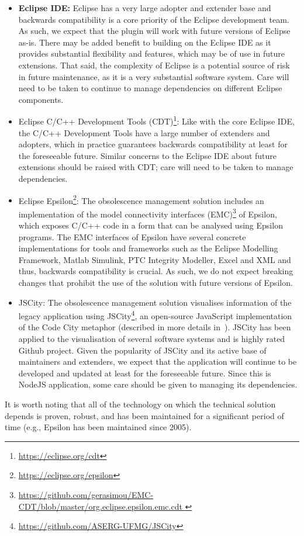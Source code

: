 \documentclass{llncs}
\begin{document}
\begin{itemize}
\item \textbf{Eclipse IDE:} Eclipse has a very large adopter and extender base and backwards compatibility is a core priority of the Eclipse development team. As such, we expect that the plugin will work with future versions of Eclipse as-is. There may be added benefit to building on the Eclipse IDE as it provides substantial flexibility and features, which may be of use in future extensions. That said, the complexity of Eclipse is a potential source of risk in future maintenance, as it is a very substantial software system. Care will need to be taken to continue to manage dependencies on different Eclipse components.

\item Eclipse C/C++ Development Tools (CDT)\footnote{\url{https://eclipse.org/cdt}}: Like with the core Eclipse IDE, the C/C++ Development Tools have a large number of extenders and adopters, which in practice guarantees backwards compatibility at least for the foreseeable future. Similar concerns to the Eclipse IDE about future extensions should be raised with CDT; care will need to be taken to manage dependencies.

\item Eclipse Epsilon\footnote{\url{https://eclipse.org/epsilon}}: The obsolescence management solution includes an implementation of the model connectivity interfaces (EMC)\footnote{\url{https://github.com/gerasimou/EMC-CDT/blob/master/org.eclipse.epsilon.emc.cdt }} of Epsilon, which exposes C/C++ code in a form that can be analysed using Epsilon programs. The EMC interfaces of Epsilon have several concrete implementations for tools and frameworks such as the Eclipse Modelling Framework, Matlab Simulink, PTC Integrity Modeller, Excel and XML and thus, backwards compatibility is crucial. As such, we do not expect breaking changes that prohibit the use of the solution with future versions of Epsilon.

\item JSCity: The obsolescence management solution visualises 
information of the legacy application using 
JSCity\footnote{\url{https://github.com/ASERG-UFMG/JSCity}}, an open-source 
JavaScript implementation of the Code City metaphor (described in more details 
in~\cite{gerasimou17}). JSCity has been applied to the visualisation of 
several software systems and is highly rated Github project. 
Given the popularity of JSCity and its active base of maintainers and 
extenders, we expect that the application will continue to be developed and 
updated at least for the foreseeable future. Since this is NodeJS application, 
some care should be given to managing its dependencies.


\end{itemize}
It is worth noting that all of the technology on which the technical solution depends is proven, robust, and has been maintained for a significant period of time (e.g., Epsilon has been maintained since 2005).
 
\end{document}

